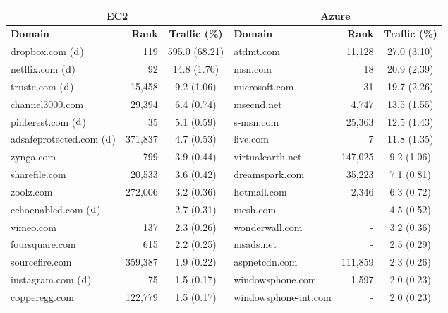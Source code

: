
\begin{tabular}{|l|r|c|l|r|c|} \hline
\multicolumn{3}{|c|}{\bf EC2} & \multicolumn{3}{|c|}{\bf Azure} \\
\hline
{\bf Domain} & {\bf Rank}& {\bf Traffic (\%)} & {\bf Domain} & {\bf Rank}&{\bf Traffic (\%)} \\ \hline
dropbox.com ($\mathrm{d}$) & 119 & 595.0 (68.21) & atdmt.com & 11,128 & 27.0 (3.10) \\
netflix.com ($\mathrm{d}$) & 92 & 14.8 (1.70) & msn.com & 18 & 20.9 (2.39) \\ 
truste.com ($\mathrm{d}$) & 15,458 & 9.2 (1.06) & microsoft.com & 31 & 19.7 (2.26) \\ 
channel3000.com & 29,394 & 6.4 (0.74) & msecnd.net & 4,747 & 13.5 (1.55) \\ 
pinterest.com ($\mathrm{d}$) & 35 & 5.1 (0.59) & s-msn.com & 25,363 & 12.5 (1.43) \\ 
adsafeprotected.com ($\mathrm{d}$) & 371,837 & 4.7 (0.53) & live.com & 7 & 11.8 (1.35)\\ 
zynga.com & 799 & 3.9 (0.44) & virtualearth.net & 147,025 & 9.2 (1.06) \\ 
sharefile.com & 20,533 & 3.6 (0.42) & dreamspark.com & 35,223 & 7.1 (0.81) \\ 
zoolz.com & 272,006 & 3.2 (0.36) & hotmail.com & 2,346 & 6.3 (0.72) \\ 
echoenabled.com ($\mathrm{d}$) & - & 2.7 (0.31) & mesh.com & - & 4.5 (0.52)\\ 
vimeo.com & 137 & 2.3 (0.26) & wonderwall.com & - & 3.2 (0.36) \\ 
foursquare.com & 615 & 2.2 (0.25) & msads.net & - & 2.5 (0.29) \\ 
sourcefire.com & 359,387 & 1.9 (0.22) & aspnetcdn.com & 111,859 & 2.3 (0.26) \\ 
instagram.com ($\mathrm{d}$) & 75 & 1.5 (0.17) & windowsphone.com & 1,597 & 2.0 (0.23) \\ 
copperegg.com & 122,779 & 1.5 (0.17) & windowsphone-int.com & - & 2.0 (0.23)  \\
 \hline
\end{tabular}

